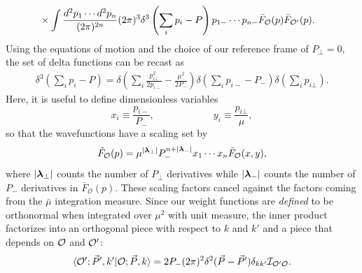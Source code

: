 \begin{subappendices}
\begin{equation}
\begin{aligned}
        &\times \int \frac{d^2 p_1 \dotsb d^2 p_n}{(2\pi)^{2n}} (2\pi)^3 \delta^3\left(\sum_i p_i - P \right)
        p_{1-} \dotsb p_{n-} \bar{F}_{{\cal O}}(p) \bar{F}_{{\cal O}'}(p).
    \end{aligned}
\end{equation} 
Using the equations of motion and the choice of our reference frame of 
$P_\bot = 0$, the set of delta functions can be recast as 
\begin{equation}
    \begin{aligned}
        \delta^3\left(\sum_i p_i - P \right) = \delta\left(\sum_i \frac{p_{i\bot}^2}{2p_{i-}} - \frac{\mu^2}{2P_-} \right)\delta\left(\sum_i p_{i-} - P_- \right)\delta\left(\sum_i p_{i\bot}\right).
    \end{aligned}
\end{equation} 
Here, it is useful to define dimensionless variables 
\begin{equation}
    x_i \equiv \frac{p_{i-}}{P_-},\quad\quad\quad\quad\quad\quad y_i \equiv \frac{p_{i\bot}}{\mu}, \label{dimlessvars}
\end{equation} 
so that the wavefunctions have a scaling set by 
\begin{equation}
    \tilde{F}_{{\cal O}}(p) = \mu^{|\boldsymbol{\lambda}_\bot|} P_-^{n+|\boldsymbol{\lambda}_-|} x_1 \dotsb x_n \bar{F}_{{\cal O}}(x,y),
\end{equation} 
where $|\boldsymbol{\lambda}_\bot|$ counts the number of $P_\bot$ derivatives while 
$|\boldsymbol{\lambda}_-|$ counts the number of $P_-$ derivatives in 
$\bar{F}_{\mathcal{O}}(p)$. These scaling factors cancel against the factors 
coming from the $\bar{\mu}$ integration measure. Since our weight functions are 
\textit{defined} to be orthonormal when integrated over $\mu^2$ with unit 
measure, the inner product factorizes into an orthogonal piece with respect to 
$k$ and $k'$ and a piece that depends on ${\cal O}$ and ${\cal O}'$: 
\begin{equation}
    \begin{aligned} 
        \langle \mathcal{O}';\vec{P}', k'|\mathcal{O};\vec{P}, k\rangle = 2P_- (2\pi)^2 \delta^2 (\vec{P}-\vec{P}') \delta_{k k'} \mathcal{I}_{\mathcal{O'}\mathcal{O}}.
    \end{aligned}
\end{equation}


\end{subappendices}
